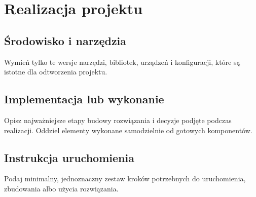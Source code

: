 \chapter{Realizacja projektu}
\label{chap:realizacja}

\section{Środowisko i narzędzia}
Wymień tylko te wersje narzędzi, bibliotek, urządzeń i konfiguracji, które są istotne dla odtworzenia projektu.

\section{Implementacja lub wykonanie}
Opisz najważniejsze etapy budowy rozwiązania i decyzje podjęte podczas realizacji. Oddziel elementy wykonane samodzielnie od gotowych komponentów.

\section{Instrukcja uruchomienia}
Podaj minimalny, jednoznaczny zestaw kroków potrzebnych do uruchomienia, zbudowania albo użycia rozwiązania.

% 
